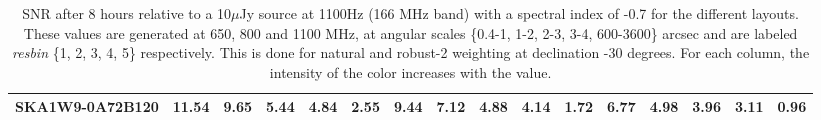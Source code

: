 \begin{table}[!htp]
{{\begin{tabular}{|lccccc||ccccc||ccccc|}
SKA1W9-0A72B120 & 11.54 \cellcolor{blue!43.11} & 9.65 \cellcolor{red!41.50} & 5.44 \cellcolor{green!18.00} & 4.84 \cellcolor{orange!18.00} & 2.55 \cellcolor{purple!18.00} & 9.44 \cellcolor{blue!36.77} & 7.12 \cellcolor{red!30.71} & 4.88 \cellcolor{green!18.00} & 4.14 \cellcolor{orange!18.00} & 1.72 \cellcolor{purple!26.40} & 6.77 \cellcolor{blue!24.65} & 4.98 \cellcolor{red!18.00} & 3.96 \cellcolor{green!18.00} & 3.11 \cellcolor{orange!18.00} & 0.96 \cellcolor{purple!26.40}\\ \hline 
\end{tabular}}
\hspace{1cm} 

\vspace{.0cm}
\caption{SNR after 8 hours relative to a 10$\mu$Jy source at 1100Hz (166 MHz band) with a spectral index of -0.7 for the different layouts. These values are generated at 650, 800 and 1100 MHz, at angular scales \{0.4-1, 1-2, 2-3, 3-4, 600-3600\} arcsec and are labeled {\it resbin} \{1, 2, 3, 4, 5\} respectively. This is done for natural and robust-2 weighting at declination -30 degrees. For each column, the intensity of the color increases with the value.}\label{tab:snr10}}
 \end{table}
